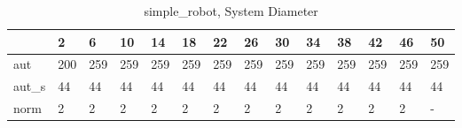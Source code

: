 \begin{table}
\caption{simple_robot, System Diameter}
\label{simple_robot_diam}
\begin{tabular}{llllllllllllll}
\toprule
 & 2 & 6 & 10 & 14 & 18 & 22 & 26 & 30 & 34 & 38 & 42 & 46 & 50 \\
\midrule
aut & 200 & 259 & 259 & 259 & 259 & 259 & 259 & 259 & 259 & 259 & 259 & 259 & 259 \\
aut_s & 44 & 44 & 44 & 44 & 44 & 44 & 44 & 44 & 44 & 44 & 44 & 44 & 44 \\
norm & 2 & 2 & 2 & 2 & 2 & 2 & 2 & 2 & 2 & 2 & 2 & 2 & - \\
\bottomrule
\end{tabular}
\end{table}
